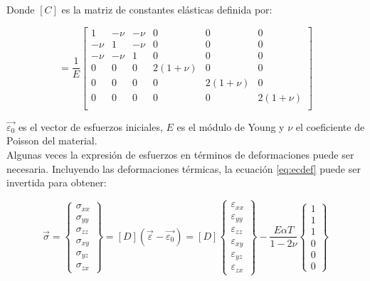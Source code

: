 Donde $[C]$ es la matriz de constantes elásticas definida por:

\begin{equation}
[C] = \frac{1}{E}
\left[\begin{matrix}
1 & -\nu & -\nu & 0 & 0 & 0 \\
-\nu & 1 & -\nu & 0 & 0 & 0 \\
-\nu & -\nu & 1 & 0 & 0 & 0 \\
0 & 0 & 0 & 2(1+\nu) & 0 & 0 \\
0 & 0 & 0 & 0 & 2(1+\nu) & 0 \\
0 & 0 & 0 & 0 & 0 & 2(1+\nu) \\
\end{matrix}\right]
\end{equation}

$\vec{\varepsilon_0}$ es el vector de esfuerzos iniciales, $E$ es el módulo de Young y $\nu$ el coeficiente de Poisson del 
material.\\

Algunas veces la expresión de esfuerzos en términos de deformaciones puede ser necesaria. Incluyendo las deformaciones 
térmicas, la ecuación \ref{eq:ecdef} puede ser invertida para obtener:

\begin{equation}
\vec{\sigma} = 
\left\{\begin{matrix}
\sigma_{xx} \\ \sigma_{yy} \\ \sigma_{zz} \\ \sigma_{xy} \\ \sigma_{yz} \\ \sigma_{zx}
\end{matrix}\right\} = 
\left[ D \right] (\vec{\varepsilon} - \vec{\varepsilon_0})= 
\left[ D \right] 
\left\{\begin{matrix}
\varepsilon_{xx} \\ \varepsilon_{yy} \\ \varepsilon_{zz} \\ \varepsilon_{xy} \\ \varepsilon_{yz} \\ \varepsilon_{zx}
\end{matrix}\right\} - 
\frac{E\alpha T}{1-2\nu}
\left\{\begin{matrix}
1 \\ 1 \\ 1 \\ 0 \\ 0 \\ 0
\end{matrix}\right\} 
\end{equation}

